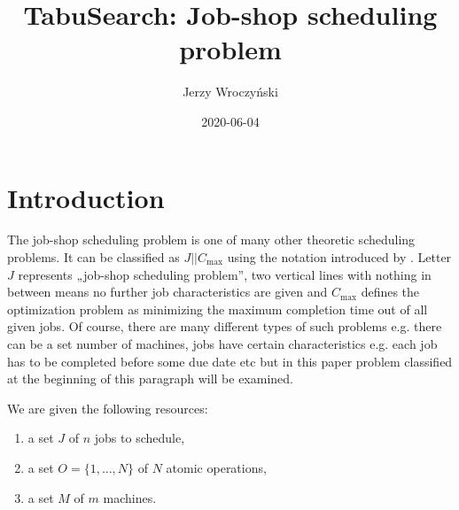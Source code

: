 \documentclass[14pt]{article}
\title{TabuSearch: Job-shop scheduling problem}
\author{Jerzy Wroczyński}
\date{2020-06-04}
\begin{document}
\maketitle

\section{Introduction}

The job-shop scheduling problem is one of many other theoretic scheduling problems. It can be classified as $J || C_{\max}$ using the notation introduced by \citet{graham}. Letter $J$ represents „job-shop scheduling problem”, two vertical lines with nothing in between means no further job characteristics are given and $C_{\max}$ defines the optimization problem as minimizing the maximum completion time out of all given jobs. Of course, there are many different types of such problems e.g. there can be a set number of machines, jobs have certain characteristics e.g. each job has to be completed before some due date etc but in this paper problem classified at the beginning of this paragraph will be examined.

\hspace{2pt}

We are given the following resources:
\begin{enumerate}
  \item a set $J$ of $n$ jobs to schedule,
  \item a set $O = \{1,\dots,N\}$ of $N$ atomic operations,
  \item a set $M$ of $m$ machines.
\end{enumerate}





\end{document}
